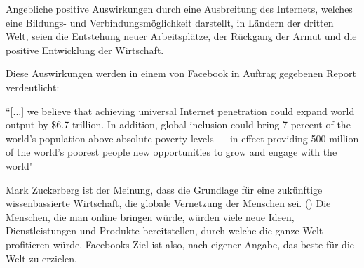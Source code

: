 \documentclass{article}
\begin{document}
\medskip

Angebliche positive Auswirkungen durch eine Ausbreitung des Internets, welches eine Bildungs- und Verbindungsmöglichkeit darstellt, in Ländern der dritten Welt, seien die Entstehung neuer Arbeitsplätze, der Rückgang der Armut und die positive Entwicklung der Wirtschaft.
    
Diese Auswirkungen werden in einem von Facebook in Auftrag gegebenen Report verdeutlicht:
                    
``[...] we believe that achieving universal Internet penetration could expand world output by \$6.7 trillion.  
In addition, global inclusion could bring 7 percent of the world’s population above absolute poverty levels — in effect providing 500 
million of the world’s poorest people new opportunities to grow and engage with the world"
\parencite{connectWorld}

\medskip

Mark Zuckerberg ist der Meinung, dass die Grundlage für eine zukünftige wissenbassierte Wirtschaft, die globale Vernetzung der Menschen sei.
(\cite{HumanRight})
Die Menschen, die man online bringen würde, würden viele neue Ideen, Dienstleistungen und Produkte bereitstellen, durch welche die ganze Welt profitieren würde.
Facebooks Ziel ist also, nach eigener Angabe, das beste für die Welt zu erzielen.
\end{document}
